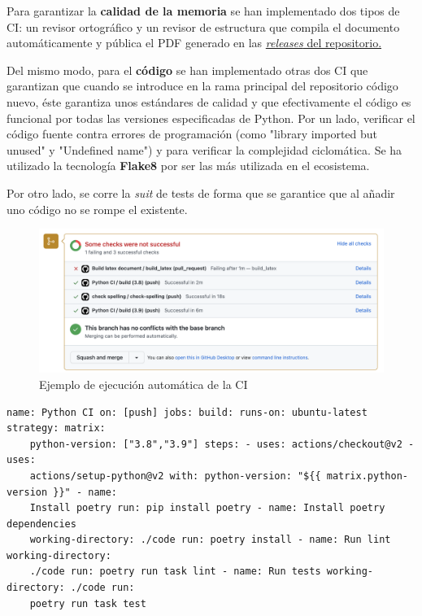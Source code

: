 Para garantizar la \textbf{calidad de la memoria} se han implementado dos tipos de CI: un
revisor ortográfico y un revisor de estructura que compila el documento automáticamente y
pública el PDF generado en las
\href{https://github.com/pablojjimenez/TFG/releases}{\textit{releases} del repositorio.}

Del mismo modo, para el \textbf{código} se han implementado otras dos CI que garantizan
que cuando se introduce en la rama principal del repositorio código nuevo, éste garantiza
unos estándares de calidad y que efectivamente el código es funcional por todas las
versiones especificadas de Python. Por un lado, verificar el código fuente contra errores
de programación (como "library imported but unused" y "Undefined name") y para verificar
la complejidad ciclomática. Se ha utilizado la tecnología \textbf{Flake8} por ser las más
utilizada en el ecosistema.

Por otro lado, se corre la \textit{suit} de tests de forma que se garantice que al añadir
uno código no se rompe el existente. 

\FloatBarrier
\begin{figure}[h]
	\centering	
	\includegraphics[width=\textwidth]{doc/logos/imgs/CI-pr.png}
    \caption{Ejemplo de ejecución automática de la CI}
    \label{fig:tipos-de-cc}
\end{figure}
\FloatBarrier

\begin{lstlisting}[caption=Definición de las etapas de la CI del código del proyecto ]
    name: Python CI on: [push] jobs: build: runs-on: ubuntu-latest strategy: matrix:
    python-version: ["3.8","3.9"] steps: - uses: actions/checkout@v2 - uses:
    actions/setup-python@v2 with: python-version: "${{ matrix.python-version }}" - name:
    Install poetry run: pip install poetry - name: Install poetry dependencies
    working-directory: ./code run: poetry install - name: Run lint working-directory:
    ./code run: poetry run task lint - name: Run tests working-directory: ./code run:
    poetry run task test
\end{lstlisting}

